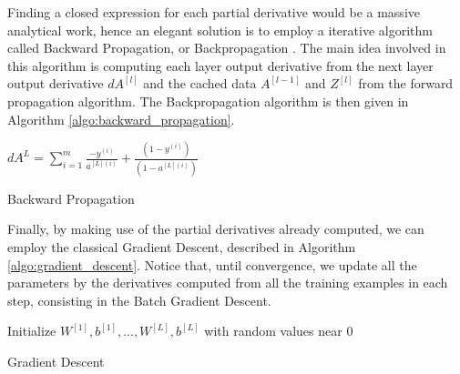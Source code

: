 Finding a closed expression for each partial derivative would be a massive analytical work, hence an elegant solution is to employ a iterative algorithm called Backward Propagation, or Backpropagation \cite{neuralnetworks, DeepLearningBook}. The main idea involved in this algorithm is computing each layer output derivative from the next layer output derivative $dA^{[l]}$ and the cached data $A^{[l-1]}$ and $Z^{[l]}$ from the forward propagation algorithm. The Backpropagation algorithm is then given in Algorithm \ref{algo:backward_propagation}.

\begin{algorithm}[H]
    \DontPrintSemicolon
    \SetAlgoLined
    $dA^{L} = \sum_{i=1}^m{\frac{-y^{(i)}}{a^{[L](i)}} + \frac{(1-y^{(i)})}{(1-a^{[L](i)})}}$\;
    \caption{Backward Propagation}
    \label{algo:backward_propagation}
\end{algorithm}

Finally, by making use of the partial derivatives already computed, we can employ the classical Gradient Descent, described in Algorithm \ref{algo:gradient_descent}. Notice that, until convergence, we update all the parameters by the derivatives computed from all the training examples in each step, consisting in the Batch Gradient Descent.

\begin{algorithm}[H]
    \DontPrintSemicolon
    \SetAlgoLined
    Initialize $W^{[1]},b^{[1]},...,W^{[L]},b^{[L]}$ with random values near $0$\;
    \caption{Gradient Descent}
    \label{algo:gradient_descent}
\end{algorithm}



